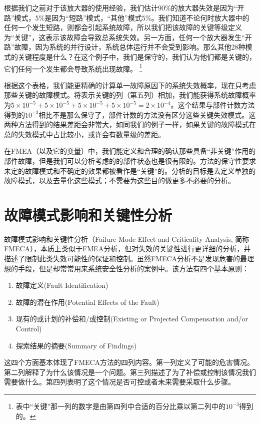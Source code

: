 \documentclass[cn,11pt,chinese]{elegantbook}
\begin{document}
根据我们之前对于该放大器的使用经验，我们估计$90\%$的放大器失效是因为“开路”模式，$5\%$是因为“短路”模式，“其他”模式$5\%$。我们知道不论何时放大器中的任何一个发生短路，则都会引起系统故障，所以我们把该故障的关键等级定义为“关键”，这表示该故障会导致总系统失效。另一方面，任何一个放大器发生“开路”故障，因为系统的并行设计，系统总体运行并不会受到影响。那么其他28种模式的关键程度是什么？在这个例子中，我们是保守的，我们认为他们都是关键的，它们任何一个发生都会导致系统出现故障。
\footnote{表中“关键”那一列的数字是由第四列中合适的百分比乘以第二列中的$10^{-3}$得到的。}

根据这个表格，我们能更精确的计算单一故障原因下的系统失效概率，现在只考虑那些关键的故障模式。将表示关键的列（第五列）相加，我们能获得系统故障概率为$5 \times 10^{-5}+ 5 \times 10^{-5}+ 5 \times 10^{-5}+ 5 \times 10^{-5}=2 \times 10^{-4}$。这个结果与部件计数方法得到的$10^{-3}$相比不是那么保守了，部件计数的方法没有区分这些关键失效模式。这两种方法得到的结果差距会非常大，如同我们的例子一样，如果关键的故障模式在总的失效模式中占比较小，或许会有数量级的差距。

在FMEA（以及它的变量）中，我们能定义和合理的确认那些具备“非关键”作用的部件故障，但是我们可以分析考虑的的部件状态也是很有限的。方法的保守性要求未定的故障模式和不确定的效果都被看作是“关键”的。分析的目标是去定义单独的故障模式，以及去量化这些模式；不需要为这些目的做更多不必要的分析。

\section{故障模式影响和关键性分析}

故障模式影响和关键性分析（Failure Mode Effect and Criticality Analysis, 简称FMECA），本质上类似于FMEA分析，但对失效的关键性进行更详细的分析，并描述了限制此类失效可能性的保证和控制。虽然FMECA分析不是发现危害的最理想的手段，但是却常常用来系统安全性分析的案例中。该方法有四个基本原则：

\begin{enumerate}
	\item 故障定义(Fault Identification)
	\item 故障的潜在作用(Potential Effects of the Fault)
	\item 现有的或计划的补偿和/或控制(Existing or Projected Compensation and/or Control)
	\item 探索结果的摘要(Summary of Findings)
\end{enumerate}

这四个方面基本体现了FMECA方法的四列内容。第一列定义了可能的危害情况。第二列解释了为什么该情况是一个问题。第三列描述了为了补偿或控制该情况我们需要做什么。第四列表明了这个情况是否可控或者未来需要采取什么步骤。
\end{document}
